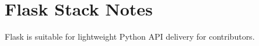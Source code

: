 \section{Flask Stack Notes}

Flask is suitable for lightweight Python API delivery for contributors.
